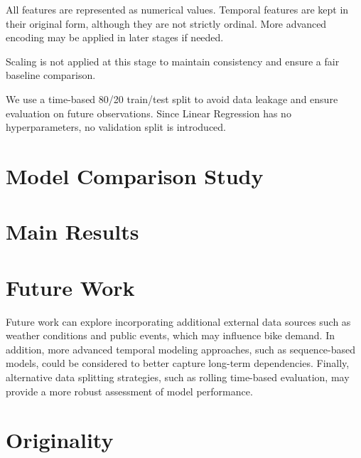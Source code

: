 \documentclass[11pt]{article}
\begin{document}
All features are represented as numerical values. Temporal features are kept in their original form, although they are not strictly ordinal. More advanced encoding may be applied in later stages if needed.

Scaling is not applied at this stage to maintain consistency and ensure a fair baseline comparison.

We use a time-based 80/20 train/test split to avoid data leakage and ensure evaluation on future observations. Since Linear Regression has no hyperparameters, no validation split is introduced.

\section{Model Comparison Study}

\section{Main Results}

\section{Future Work}

Future work can explore incorporating additional external data sources such as weather conditions and public events, which may influence bike demand. In addition, more advanced temporal modeling approaches, such as sequence-based models, could be considered to better capture long-term dependencies. Finally, alternative data splitting strategies, such as rolling time-based evaluation, may provide a more robust assessment of model performance.

\section{Originality}
\end{document}
